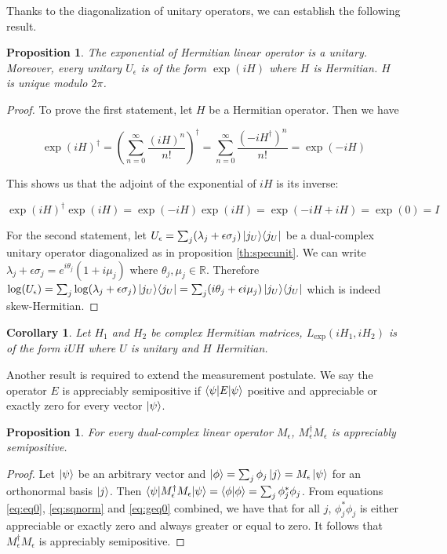 \documentclass{article}
\newtheorem{proposition}[theorem]{Proposition}
\newtheorem{corollary}[theorem]{Corollary}
\newcommand{\R}{\mathbb{R}}
\newcommand{\e}{\epsilon}
\newcommand\ketbra[2]{\ket{#1}\!\bra{#2}}
\begin{document}
Thanks to the diagonalization of unitary operators, we can establish the following result.

\begin{proposition}\label{pr:hermunit}
The exponential of Hermitian linear operator is a unitary. Moreover, every unitary $U_\e$ is of the form $\exp(iH)$ where $H$ is Hermitian. $H$ is unique modulo $2\pi$.
\end{proposition}
\begin{proof}
To prove the first statement, let $H$ be a Hermitian operator. Then we have

\begin{equation}
 \exp(iH)^\dagger = (\sum_{n=0}^\infty \frac{(iH)^n}{n!})^\dagger = \sum_{n=0}^\infty \frac{(-iH^\dagger)^n}{n!} = \exp(-iH)
\end{equation}

This shows us that the adjoint of the exponential of $iH$ is its inverse:

\begin{equation}
 \exp(iH)^\dagger \exp(iH) = \exp(-iH) \exp(iH) = \exp(-iH+iH) = \exp(0) = I
\end{equation}

For the second statement, let $U_\e = \sum_j (\lambda_j + \e \sigma_j) \ketbra{j_U}{j_U}$ be a dual-complex unitary operator diagonalized as in proposition \ref{th:specunit}. We can write $\lambda_j + \e \sigma_j = e^{i\theta_j}(1 + i\mu_j)$ where $\theta_j, \mu_j \in \R$. Therefore $\log(U_\e) = \sum_j \log(\lambda_j + \e \sigma_j)\ketbra{j_U}{j_U} = \sum_j (i\theta_j + \e i\mu_j)\ketbra{j_U}{j_U}$ which is indeed skew-Hermitian.

\end{proof}

\begin{corollary}
Let $H_1$ and $H_2$ be complex Hermitian matrices, $L_{\exp}(iH_1, iH_2)$ is of the form $iUH$ where $U$ is unitary and $H$ Hermitian.
\end{corollary}

Another result is required to extend the measurement postulate. We say the operator $E$ is appreciably semipositive if $\braket{\psi|E|\psi}$ positive and appreciable or exactly zero for every vector $\ket\psi$.

\begin{proposition}\label{pr:semipos}
 For every dual-complex linear operator $M_\e$, $M_\e^\dagger M_\e$ is appreciably semipositive.
\end{proposition}
\begin{proof}
Let $\ket\psi$ be an arbitrary vector and $\ket\phi = \sum_j \phi_j \ket{j} = M_\e \ket\psi$ for an orthonormal basis $\ket{j}$. Then $\braket{\psi|M_\e^\dagger M_\e|\psi} = \braket{\phi|\phi} = \sum_j \phi_j^*\phi_j$. From equations \ref{eq:eq0}, \ref{eq:sqnorm} and \ref{eq:geq0} combined, we have that for all $j$, $\phi_j^* \phi_j$ is either appreciable or exactly zero and always greater or equal to zero. It follows that $M_\e^\dagger M_\e$ is appreciably semipositive.
\end{proof}
\end{document}
